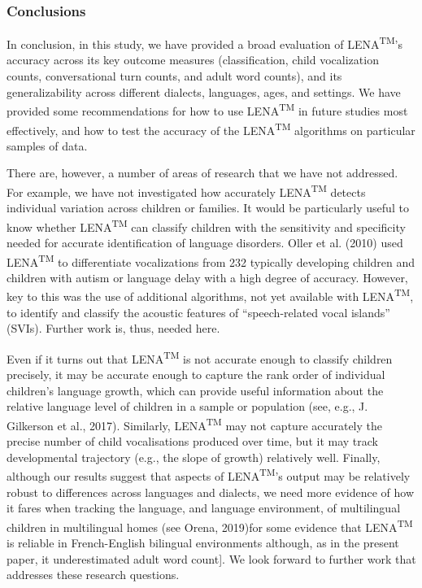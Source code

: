 \documentclass[english,floatsintext,man]{apa6}
\begin{document}
\subsubsection{Conclusions}\label{conclusions}

In conclusion, in this study, we have provided a broad evaluation of
LENA\textsuperscript{TM}'s accuracy across its key outcome measures
(classification, child vocalization counts, conversational turn counts,
and adult word counts), and its generalizability across different
dialects, languages, ages, and settings. We have provided some
recommendations for how to use LENA\textsuperscript{TM} in future
studies most effectively, and how to test the accuracy of the
LENA\textsuperscript{TM} algorithms on particular samples of data.

There are, however, a number of areas of research that we have not
addressed. For example, we have not investigated how accurately
LENA\textsuperscript{TM} detects individual variation across children or
families. It would be particularly useful to know whether
LENA\textsuperscript{TM} can classify children with the sensitivity and
specificity needed for accurate identification of language disorders.
Oller et al. (2010) used LENA\textsuperscript{TM} to differentiate
vocalizations from 232 typically developing children and children with
autism or language delay with a high degree of accuracy. However, key to
this was the use of additional algorithms, not yet available with
LENA\textsuperscript{TM}, to identify and classify the acoustic features
of \enquote{speech-related vocal islands} (SVIs). Further work is, thus,
needed here.

Even if it turns out that LENA\textsuperscript{TM} is not accurate
enough to classify children precisely, it may be accurate enough to
capture the rank order of individual children's language growth, which
can provide useful information about the relative language level of
children in a sample or population (see, e.g., J. Gilkerson et al.,
2017). Similarly, LENA\textsuperscript{TM} may not capture accurately
the precise number of child vocalisations produced over time, but it may
track developmental trajectory (e.g., the slope of growth) relatively
well. Finally, although our results suggest that aspects of
LENA\textsuperscript{TM}'s output may be relatively robust to
differences across languages and dialects, we need more evidence of how
it fares when tracking the language, and language environment, of
multilingual children in multilingual homes (see Orena, 2019)for some
evidence that LENA\textsuperscript{TM} is reliable in French-English
bilingual environments although, as in the present paper, it
underestimated adult word count{]}. We look forward to further work that
addresses these research questions.
\end{document}
